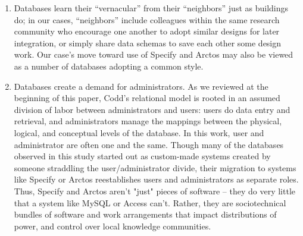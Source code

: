 \begin{enumerate}
\item Databases learn their “vernacular” from their “neighbors” just as buildings do; in our cases, “neighbors” include colleagues within the same research community who encourage one another to adopt similar designs for later integration, or simply share data schemas to save each other some design work. Our case’s move toward use of Specify and Arctos may also be viewed as a number of databases adopting a common style. 
\item Databases create a demand for administrators. As we reviewed at the beginning of this paper, Codd’s relational model is rooted in an assumed division of labor between administrators and users: users do data entry and retrieval, and administrators manage the mappings between the physical, logical, and conceptual levels of the database. In this work, user and administrator are often one and the same. Though many of the databases observed in this study started out as custom-made systems created by someone straddling the user/administrator divide, their migration to systems like Specify or Arctos reestablishes users and administrators as separate roles. Thus, Specify and Arctos aren't "just" pieces of software -- they do very little that a system like MySQL or Access can't. Rather, they are sociotechnical bundles of software and work arrangements that impact distributions of power, and control over local knowledge communities.
\end{enumerate}
